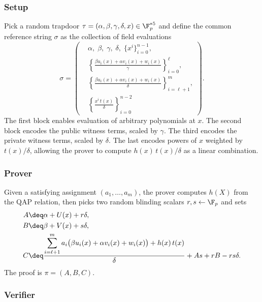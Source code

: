 \subsubsection*{Setup}

Pick a random trapdoor $\tau = (\alpha, \beta, \gamma, \delta, x) \in \F_p^{*5}$ and define the common reference string $\sigma$ as the collection of field evaluations
\[
\sigma =
\left(
\begin{aligned}
&\alpha,\; \beta,\; \gamma,\; \delta,\;\{x^i\}_{i=0}^{n-1},\\[2pt]
&\left\{\frac{\beta u_i(x)+\alpha v_i(x)+w_i(x)}{\gamma}\right\}_{i=0}^{\ell},\\[4pt]
&\left\{\frac{\beta u_i(x)+\alpha v_i(x)+w_i(x)}{\delta}\right\}_{i=\ell+1}^{m},\\[4pt]
&\left\{\frac{x^i\, t(x)}{\delta}\right\}_{i=0}^{n-2}
\end{aligned}
\right).
\]
The first block enables evaluation of arbitrary polynomials at $x$. The second block encodes the public witness terms, scaled by $\gamma$. The third encodes the private witness terms, scaled by $\delta$. The last encodes powers of $x$ weighted by $t(x)/\delta$, allowing the prover to compute $h(x)\,t(x)/\delta$ as a linear combination.


\subsubsection*{Prover}

Given a satisfying assignment $(a_1, \ldots, a_m)$, the prover computes $h(X)$ from the QAP relation, then picks two random blinding scalars $r, s \leftarrow \F_p$ and sets
\begin{align*}
  A &\deq \alpha + U(x) + r\delta, \\
  B &\deq \beta  + V(x) + s\delta, \\
  C &\deq \frac{\displaystyle\sum_{i=\ell+1}^{m} a_i\bigl(\beta u_i(x)+\alpha v_i(x)+w_i(x)\bigr) + h(x)\,t(x)}{\delta} + As + rB - rs\delta.
\end{align*}
The proof is $\pi = (A, B, C)$.

\subsubsection*{Verifier}


